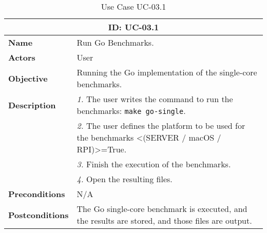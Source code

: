 \begin{table}[H]
    \centering
    \begin{tabular}{l p{10cm}}
        \toprule
        \multicolumn{2}{c}{\textbf{ID: UC-03.1}} \\
        \toprule
        \textbf{Name}                         &  Run Go Benchmarks. \\
        \textbf{Actors}                       &  User \\
        \textbf{Objective}                    &  Running the Go implementation of the single-core benchmarks. \\
        \multirow{1}{*}{\textbf{Description}} & \textsl{1.} The user writes the command to run the benchmarks: \texttt{make go-single}.\\
                                              & \textsl{2.} The user defines the platform to be used for the benchmarks <(SERVER / macOS / RPI)>=True.\\
                                              & \textsl{3.} Finish the execution of the benchmarks.\\
                                              & \textsl{4.} Open the resulting files.\\
        \textbf{Preconditions}                &  N/A \\
        \textbf{Postconditions}               &  The Go single-core benchmark is executed, and the results are stored, and those files are output. \\
    \end{tabular}
    \caption{Use Case UC-03.1}
    \label{tab:uc-03.1}
\end{table}

